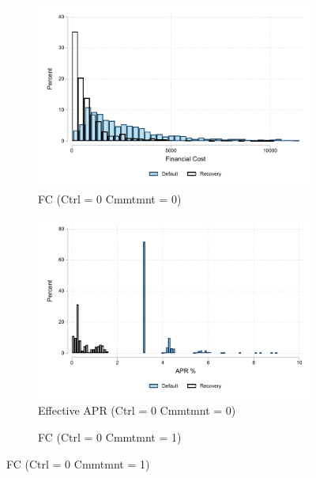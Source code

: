 \documentclass[oneside,11pt]{article}
\begin{document}
\vspace{.2in}
\begin{figure}[H]
     \caption{Distribution of FC with imputation}
    \label{fc_hist_imp}
    \begin{center}
    \begin{subfigure}{.45\textwidth}
      \caption{FC (Ctrl = 0 Cmmtmnt = 0)}
        \centering
        \includegraphics[width=\textwidth]{Figuras/hist_fc_0_0.pdf}
    \end{subfigure}
     \begin{subfigure}{0.45\textwidth}
    \caption{Effective APR (Ctrl = 0 Cmmtmnt = 0)}
       \centering
      \includegraphics[width=\textwidth]{Figuras/hist_apr_0_0.pdf}
    \end{subfigure}
   \begin{subfigure}{.45\textwidth}
      \caption{FC (Ctrl = 0 Cmmtmnt = 1)}
        \centering

\end{subfigure}
\end{center}
\end{figure}
\end{document}

